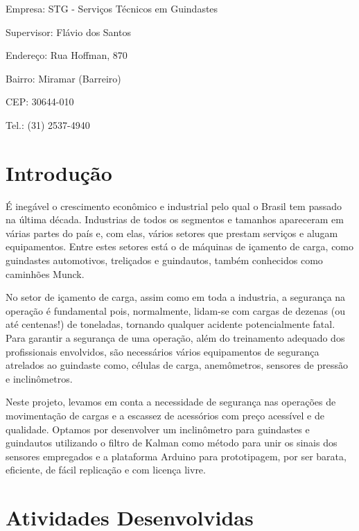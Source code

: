 \documentclass[a4paper,12pt]{article}
\begin{document}
\vspace{1.5cm}
Empresa: STG - Serviços Técnicos em Guindastes

Supervisor: Flávio dos Santos

Endereço: Rua Hoffman, 870

Bairro: Miramar (Barreiro)

CEP: 30644-010

Tel.: (31) 2537-4940
\setcounter{page}{1}

\tableofcontents

\listoffigures

\listoftables


\section{Introdução}

É inegável o crescimento econômico e industrial pelo qual o Brasil tem passado na última década. Industrias de todos os segmentos e tamanhos apareceram em várias partes do país e, com elas, vários setores que prestam serviços e alugam equipamentos. Entre estes setores está o de máquinas de içamento de carga, como guindastes automotivos, treliçados e guindautos, também conhecidos como caminhões Munck. 

No setor de içamento de carga, assim como em toda a industria, a segurança na operação é fundamental pois, normalmente, lidam-se com cargas de dezenas (ou até centenas!) de toneladas, tornando qualquer acidente potencialmente fatal. Para garantir a segurança de uma operação, além do treinamento adequado dos profissionais envolvidos, são necessários vários equipamentos de segurança atrelados ao guindaste como, células de carga, anemômetros, sensores de pressão e inclinômetros. 

Neste projeto, levamos em conta a necessidade de segurança nas operações de movimentação de cargas e a escassez de acessórios com preço acessível e de qualidade. Optamos por desenvolver um inclinômetro para guindastes e guindautos utilizando o filtro de Kalman como método para unir os sinais dos sensores empregados e a plataforma Arduino para prototipagem, por ser barata, eficiente, de fácil replicação e com licença livre.


\section{Atividades Desenvolvidas}
\end{document}
